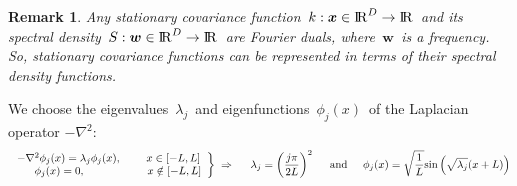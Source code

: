 \documentclass[portrait,a1,final]{a0poster} %
\newtheorem*{remark}{Remark}
\let\tempone\itemize
\let\temptwo\enditemize
\renewenvironment{itemize}{\tempone\addtolength{\itemsep}{-0.3\baselineskip}}{\temptwo}
\begin{document}
\begin{minipage}{1\linewidth}
\begin{minipage}[t]{0.48\linewidth}
\begin{itemize}
\begin{remark}
Any stationary covariance function\, $k:\bm{x} \in {\rm I\!R}^{D} \to {\rm I\!R}$\, and its {\color{navyblue} spectral density}\, $S:\bm{w} \in {\rm I\!R}^{D} \to {\rm I\!R}$\, are Fourier duals, where\, $\bm{w}$\, is a frequency. So, stationary covariance functions can be represented in terms of their spectral density functions.
\end{remark}

\item We choose the {\color{navyblue} eigenvalues}\, $\lambda_j$\, and {\color{navyblue} eigenfunctions}\, $\phi_j(x)$\, of the Laplacian operator $-\nabla^2$:
%
\begin{align*}
\left. \begin{array}{cc}
 -\nabla^2 \phi_j(x) = \lambda_j \phi_j(x), \hspace{0.8cm}  x \in [-L,L] \\
\hspace{6mm} \phi_j(x) = 0, \hspace{2cm} x \notin [-L,L] 
\end{array} \right\} \; \Rightarrow \hspace{5mm} \lambda_j=\left(\frac{j\pi}{2L}\right)^2 \hspace{5mm} \text{and} \hspace{5mm}
\phi_j(x)=\sqrt{\frac{1}{L}} \text{sin}\left(\sqrt{\lambda_j}(x+L)\right)
\end{align*} 

%


\end{itemize}
\end{minipage}
\end{minipage}
\end{document}
